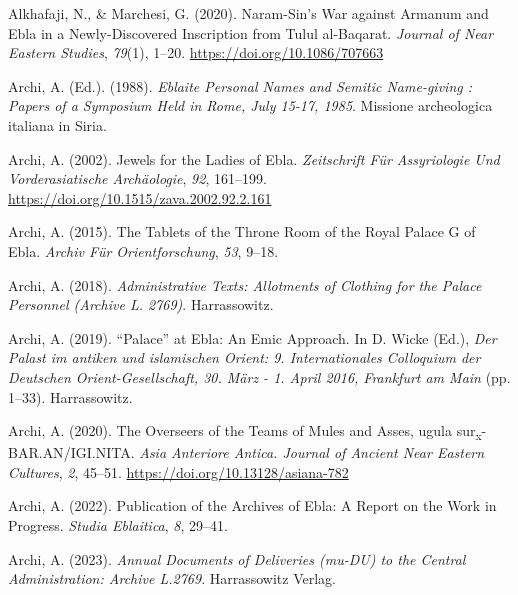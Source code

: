 \documentclass[
]{book}
\newlength{\cslhangindent}
\newlength{\cslentryspacingunit} %
\newenvironment{CSLReferences}[2] %
 {%
  \setlength{\parindent}{0pt}
  \ifodd #1
  \let\oldpar\par
  \def\par{\hangindent=\cslhangindent\oldpar}
  \fi
  \setlength{\parskip}{#2\cslentryspacingunit}
 }%
 {}
\begin{document}
\hypertarget{refs}{}
\begin{CSLReferences}{1}{0}
\leavevmode{}%
Alkhafaji, N., \& Marchesi, G. (2020). Naram-{Sin}'s {War} against {Armanum} and {Ebla} in a {Newly-Discovered Inscription} from {Tulul} al-{Baqarat}. \emph{Journal of Near Eastern Studies}, \emph{79}(1), 1--20. \url{https://doi.org/10.1086/707663}

\leavevmode{}%
Archi, A. (Ed.). (1988). \emph{Eblaite {Personal Names} and {Semitic Name-giving} : {Papers} of a {Symposium Held} in {Rome}, {July} 15-17, 1985}. Missione archeologica italiana in Siria.

\leavevmode{}%
Archi, A. (2002). Jewels for the {Ladies} of {Ebla}. \emph{Zeitschrift Für Assyriologie Und Vorderasiatische Archäologie}, \emph{92}, 161--199. \url{https://doi.org/10.1515/zava.2002.92.2.161}

\leavevmode{}%
Archi, A. (2015). The {Tablets} of the {Throne Room} of the {Royal Palace G} of {Ebla}. \emph{Archiv Für Orientforschung}, \emph{53}, 9--18.

\leavevmode{}%
Archi, A. (2018). \emph{Administrative {Texts}: {Allotments} of {Clothing} for the {Palace Personnel} ({Archive L}. 2769)}. Harrassowitz.

\leavevmode{}%
Archi, A. (2019). {``Palace''} at Ebla: An Emic Approach. In D. Wicke (Ed.), \emph{Der Palast im antiken und islamischen Orient: 9. Internationales Colloquium der Deutschen Orient-Gesellschaft, 30. März - 1. April 2016, Frankfurt am Main} (pp. 1--33). Harrassowitz.

\leavevmode{}%
Archi, A. (2020). The {Overseers} of the {Teams} of {Mules} and {Asses}, ugula sur{\textsubscript{x}}-{BAR}.{AN}/{IGI}.{NITA}. \emph{Asia Anteriore Antica. Journal of Ancient Near Eastern Cultures}, \emph{2}, 45--51. \url{https://doi.org/10.13128/asiana-782}

\leavevmode{}%
Archi, A. (2022). Publication of the {Archives} of {Ebla}: {A Report} on the {Work} in {Progress}. \emph{Studia Eblaitica}, \emph{8}, 29--41.

\leavevmode{}%
Archi, A. (2023). \emph{Annual {Documents} of {Deliveries} (mu-{DU}) to the {Central Administration}: {Archive L}.2769}. Harrassowitz Verlag.


\end{CSLReferences}
\end{document}
